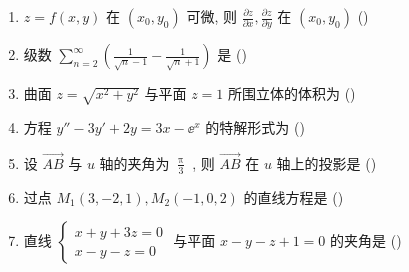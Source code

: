 \begin{enumerate}
	\item $z=f(x, y)$ 在 $\left(x_{0}, y_{0}\right)$ 可微, 则 $\frac{\partial z}{\partial x}, \frac{\partial z}{\partial y}$ 在 $\left(x_{0}, y_{0}\right)$ (\hspace{1pc})
	
	\item 级数 $\sum_{n=2}^{\infty}\left(\frac{1}{\sqrt{n}-1}-\frac{1}{\sqrt{n}+1}\right)$ 是 (\hspace{1pc})
	
	\item 曲面 $z=\sqrt{x^{2}+y^{2}}$ 与平面 $z=1$ 所围立体的体积为 (\hspace{1pc})
	
	\item 方程 $y''-3 y'+2 y=3 x-\ee^{x}$ 的特解形式为 (\hspace{1pc})
	
	\item 设 $\overrightarrow{AB}$ 与 $u$ 轴的夹角为 $\frac{\uppi}{3}$ , 则 $\overrightarrow{AB}$ 在 $u$ 轴上的投影是 (\hspace{1pc})
	
	\item 过点 $M_{1}(3,-2,1), M_{2}(-1,0,2)$ 的直线方程是 (\hspace{1pc})
	
	\item 直线 $\begin{cases}
	x+y+3 z=0\\
	x-y-z=0
	\end{cases}$ 与平面 $x-y-z+1=0$ 的夹角是 (\hspace{1pc})
	

\end{enumerate}
